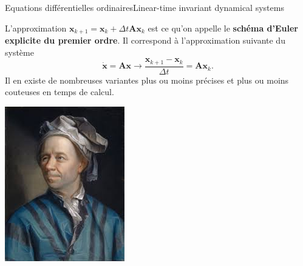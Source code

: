 \documentclass[usenames,dvipsnames,svgnames,10pt,aspectratio=169]{beamer}
\begin{document}
\begin{frame}[t, c]{Equations différentielles ordinaires}{Linear-time invariant dynamical systems}
  \begin{minipage}{.68\textwidth}
    L'approximation $\bm{x}_{k+1} = \bm{x}_k + \Delta t \bm{Ax}_k$ est ce qu'on appelle le \alert{\textbf{schéma d'Euler explicite du premier ordre}}.
    Il correspond à l'approximation suivante du système
    \[
    \dot{\bm{x}} = \bm{Ax} \to \dfrac{\bm{x}_{k+1} - \bm{x}_k}{\Delta t} = \bm{Ax}_k.
    \]
    Il en existe de nombreuses variantes plus ou moins précises et plus ou moins couteuses en temps de calcul.
  \end{minipage}%
  \hfill
  \begin{minipage}{.28\textwidth}
    \centering
    \includegraphics[width=\textwidth]{euler}
  \end{minipage}
\end{frame}
\end{document}
